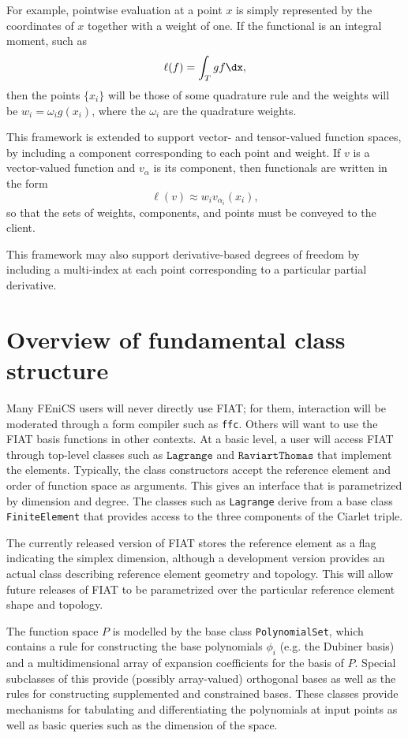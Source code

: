 For example, pointwise evaluation at a point \( x \) is simply represented
by the coordinates of \( x \) together with a weight of one. If the
functional is an integral moment, such as
\[
\ell( f ) = \int_T g f \dx,
\]
then the points \( \{ x_i \} \) will be those of some quadrature rule and
the weights will be \( w_i = \omega_i g(x_i) \), where the \( \omega_i \)
are the quadrature weights.

This framework is extended to support vector- and tensor-valued function
spaces, by including a component corresponding to each point and weight.
If \( v \) is a vector-valued function and \( v_\alpha \) is its
component, then functionals are written in the form
\[
\ell( v ) \approx w_i v_{\alpha_i}(x_i),
\]
so that the sets of weights, components, and points must be conveyed to
the client.

This framework may also support derivative-based degrees of freedom
by including a multi-index at each point corresponding to a particular
partial derivative.


\section{Overview of fundamental class structure}

Many FEniCS users will never directly use FIAT; for them, interaction
will be moderated through a form compiler such as \texttt{ffc}.
Others will want to use the FIAT basis functions in other contexts.
At a basic level, a user will access FIAT through top-level classes
such as \( \texttt{Lagrange} \) and \( \texttt{RaviartThomas} \) that
implement the elements.  Typically, the class constructors accept the
reference element and order of function space as arguments.  This gives
an interface that is parametrized by dimension and degree.  The classes
such as \texttt{Lagrange} derive from a base class \texttt{FiniteElement}
that provides access to the three components of the Ciarlet triple.

The currently released version of FIAT stores the reference element
as a flag indicating the simplex dimension, although a development
version provides an actual class describing reference element geometry
and topology.  This will allow future releases of FIAT to be parametrized
over the particular reference element shape and topology.

The function space \( P \) is modelled by the base class
\texttt{PolynomialSet}, which contains a rule for constructing the base
polynomials \( \phi_i \) (e.g. the Dubiner basis) and a multidimensional
array of expansion coefficients for the basis of \( P \).  Special
subclasses of this provide (possibly array-valued) orthogonal bases as
well as the rules for constructing supplemented and constrained bases.
These classes provide mechanisms for tabulating and differentiating
the polynomials at input points as well as basic queries such as the
dimension of the space.

